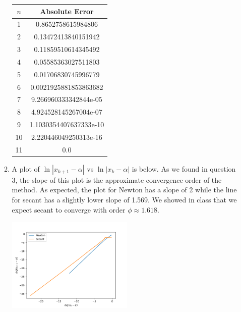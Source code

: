 \documentclass[10pt]{article}
\begin{document}
\begin{enumerate}
\begin{enumerate}
    \begin{center}
      \begin{tabular}{c|c}
        $n$ & Absolute Error \\
        \hline 
        1  &  0.8652758615984806 \\
2  &  0.13472413840151942 \\
3  &  0.11859510614345492 \\
4  &  0.05585363027511803 \\
5  &  0.01706830745996779 \\
6  &  0.0021925881853863682 \\
7  &  9.266960333342844e-05 \\
8  &  4.924528145267004e-07 \\
9  &  1.1030354407637333e-10 \\
10  &  2.220446049250313e-16 \\
11  &  0.0 \\
      \end{tabular}
    \end{center}

    \item A plot of \(\ln |x_{k+1} - \alpha |\) vs \(\ln |x_k - \alpha |\) is below. As we found in question 3, the slope of this plot is the approximate convergence order of the method. As expected, the plot for Newton has a slope of 2 while the line for secant has a slightly lower slope of 1.569. We showed in class that we expect secant to converge with order \(\phi \approx 1.618\).
    \begin{center}
      \includegraphics[width=0.5\textwidth]{hw4_5.png}
    \end{center}
  \end{enumerate}

  {\small }
\end{enumerate}
\end{document}
